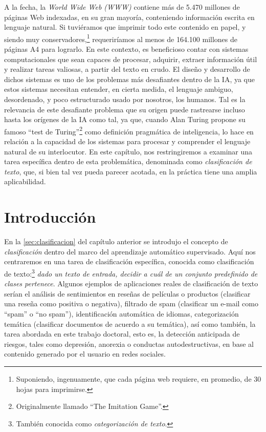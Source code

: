A la fecha, la \emph{World Wide Web (WWW)} contiene más de 5.470 millones de páginas Web indexadas\cite{www2020}, en su gran mayoría, conteniendo información escrita en lenguaje natural. Si tuviéramos que imprimir todo este contenido en papel, y siendo muy conservadores,\footnote{Suponiendo, ingenuamente, que cada página web requiere, en promedio, de 30 hojas para imprimirse\cite{harwood2015much}.} requeriríamos al menos de 164.100 millones de páginas A4 para lograrlo.
En este contexto, es beneficioso contar con sistemas computacionales que sean capaces de procesar, adquirir, extraer información útil y realizar tareas valiosas, a partir del texto en crudo.
El diseño y desarrollo de dichos sistemas es uno de los problemas más desafiantes dentro de la \ac{IA}, ya que estos sistemas necesitan entender, en cierta medida, el lenguaje ambiguo, desordenado, y poco estructurado usado por nosotros, los humanos.
Tal es la relevancia de este desafiante problema que su origen puede rastrearse incluso hasta los orígenes de la \ac{IA} como tal, ya que, cuando Alan Turing propone su famoso ``test de Turing''\cite{turing2009computing}\footnote{Originalmente llamado ``The Imitation Game''.} como definición pragmática de inteligencia, lo hace en relación a la capacidad de los sistemas para procesar y comprender el lenguaje natural de su interlocutor.
En este capítulo, nos restringiremos a examinar una tarea específica dentro de esta problemática, denominada como \emph{clasificación de texto}, que, si bien tal vez pueda parecer acotada, en la práctica tiene una amplia aplicabilidad.



\section{Introducción}

En la \autoref{sec:clasificacion} del capítulo anterior se introdujo el concepto de \emph{clasificación} dentro del marco del aprendizaje automático supervisado. Aquí nos centraremos en una tarea de clasificación específica, conocida como clasificación de texto:\footnote{También conocida como \emph{categorización de texto}.} \emph{dado un texto de entrada, decidir a cuál de un conjunto predefinido de clases pertenece}.
Algunos ejemplos de aplicaciones reales de clasificación de texto serían el análisis de sentimientos en reseñas de películas o productos (clasificar una reseña como positiva o negativa), filtrado de spam (clasificar un e-mail como ``spam'' o ``no spam''), identificación automática de idiomas, categorización temática (clasificar documentos de acuerdo a su temática), así como también, la tarea abordada en este trabajo doctoral, esto es, la detección anticipada de riesgos, tales como depresión, anorexia o conductas autodestructivas, en base al contenido generado por el usuario en redes sociales.

